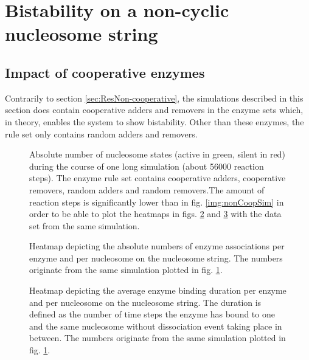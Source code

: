     \section{Bistability on a non-cyclic nucleosome string}
        \label{sec:ResNonCyc}
        \subsection{Impact of cooperative enzymes}
            \label{subsec:impactOfCooperativeEnzymes}
            Contrarily to section \ref{sec:ResNon-cooperative}, the simulations described in this section does contain cooperative adders and removers in the enzyme sets which, in theory, enables the system to show bistability. Other than these enzymes, the rule set only contains random adders and removers.

            \begin{figure}[htpb!]
                \centering
                \caption{Absolute number of nucleosome states (active in green, silent in red) during the course of one long simulation (about 56000 reaction steps). The enzyme rule set contains cooperative adders, cooperative removers, random adders and random removers.The amount of reaction steps is significantly lower than in fig. \ref{img:nonCoopSim} in order to be able to plot the heatmaps in figs. \ref{img:nonCyclBistability_bindingNumbers} and \ref{img:nonCyclBistability_bindingTimeDuration} with the data set from the same simulation.}
                \label{img:nonCyclBistability_runPlot}
            \end{figure}

            \begin{figure}[htpb!]
                \centering
                \caption{Heatmap depicting the absolute numbers of enzyme associations per enzyme and per nucleosome on the nucleosome string. The numbers originate from the same simulation plotted in fig. \ref{img:nonCyclBistability_runPlot}.}
                \label{img:nonCyclBistability_bindingNumbers}
            \end{figure}
            \begin{figure}[htpb!]
                \centering
                \caption{Heatmap depicting the average enzyme binding duration per enzyme and per nucleosome on the nucleosome string. The duration is defined as the number of time steps the enzyme has bound to one and the same nucleosome without dissociation event taking place in between. The numbers originate from the same simulation plotted in fig. \ref{img:nonCyclBistability_runPlot}.}
                \label{img:nonCyclBistability_bindingTimeDuration}
            \end{figure}

